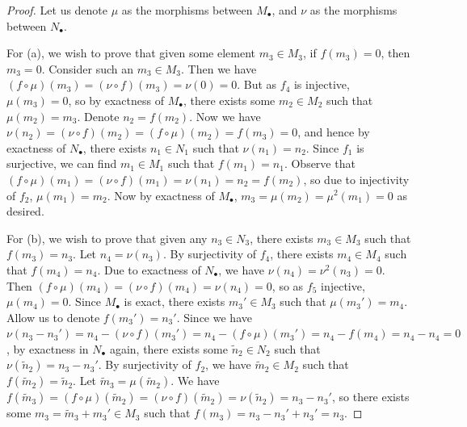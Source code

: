 \begin{proof}
    Let us denote \(\mu\) as the morphisms between \(M_\bullet\),
    and \(\nu\) as the morphisms between \(N_\bullet\).

    For (a), we wish to prove that given some element \(m_3 \in M_3\),
    if \(f(m_3) = 0\), then \(m_3 = 0\).
    Consider such an \(m_3 \in M_3\).
    Then we have \((f\circ\mu)(m_3) = (\nu\circ f)(m_3) = \nu(0) = 0\).
    But as \(f_4\) is injective, \(\mu(m_3) = 0\),
    so by exactness of \(M_\bullet\),
    there exists some \(m_2 \in M_2\) such that \(\mu(m_2) = m_3\).
    Denote \(n_2 = f(m_2)\).
    Now we have \(\nu(n_2) = (\nu\circ f)(m_2) = (f\circ\mu)(m_2) = f(m_3) = 0\),
    and hence by exactness of \(N_\bullet\),
    there exists \(n_1 \in N_1\) such that \(\nu(n_1) = n_2\).
    Since \(f_1\) is surjective, we can find \(m_1 \in M_1\) such that \(f(m_1) = n_1\).
    Observe that \((f\circ\mu)(m_1) = (\nu\circ f)(m_1) = \nu(n_1) = n_2 = f(m_2)\),
    so due to injectivity of \(f_2\), \(\mu(m_1) = m_2\).
    Now by exactness of \(M_\bullet\), \(m_3 = \mu(m_2) = \mu^2(m_1) = 0\) as desired.

    For (b), we wish to prove that given any \(n_3 \in N_3\),
    there exists \(m_3 \in M_3\) such that \(f(m_3) = n_3\).
    Let \(n_4 = \nu(n_3)\).
    By surjectivity of \(f_4\), there exists \(m_4 \in M_4\) such that \(f(m_4) = n_4\).
    Due to exactness of \(N_\bullet\), we have \(\nu(n_4) = \nu^2(n_3) = 0\).
    Then \((f\circ\mu)(m_4) = (\nu\circ f)(m_4) = \nu(n_4) = 0\),
    so as \(f_5\) injective, \(\mu(m_4) = 0\).
    Since \(M_\bullet\) is exact, there exists \(m_3' \in M_3\) such that \(\mu(m_3') = m_4\).
    Allow us to denote \(f(m_3') = n_3'\).
    Since we have \(\nu(n_3-n_3') = n_4 - (\nu\circ f)(m_3') = n_4 - (f\circ\mu)(m_3') = n_4 - f(m_4) = n_4-n_4 = 0\),
    by exactness in \(N_\bullet\) again,
    there exists some \(\tilde{n}_2 \in N_2\) such that \(\nu(\tilde{n}_2) = n_3-n_3'\).
    By surjectivity of \(f_2\), we have \(\tilde{m}_2 \in M_2\) such that \(f(\tilde{m}_2) = \tilde{n}_2\).
    Let \(\tilde{m}_3 = \mu(\tilde{m}_2)\).
    We have \(f(\tilde{m}_3) = (f\circ\mu)(\tilde{m}_2) = (\nu\circ f)(\tilde{m}_2) = \nu(\tilde{n}_2) = n_3-n_3'\),
    so there exists some \(m_3 = \tilde{m}_3 + m_3' \in M_3\)
    such that \(f(m_3) = n_3-n_3'+n_3' = n_3\).
\end{proof}

